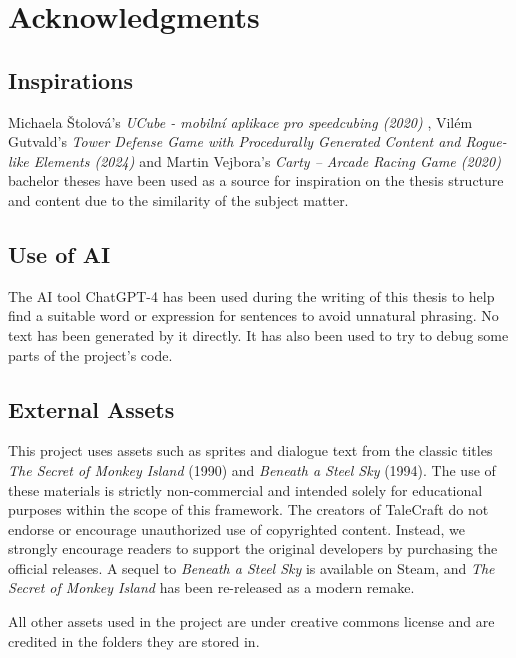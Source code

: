\chapter{Acknowledgments}

\section{Inspirations}
Michaela Štolová's \textit{UCube - mobilní aplikace pro speedcubing (2020)} \cite{Stolova2020}, Vilém Gutvald's \textit{Tower Defense Game with Procedurally Generated Content and Rogue-like Elements (2024)} \cite{Gutvald2024} and Martin Vejbora's \textit{Carty – Arcade Racing Game (2020)} \cite{Vejbora2020} bachelor theses have been used as a source for inspiration on the thesis structure and content due to the similarity of the subject matter.

\section{Use of AI}
The AI tool ChatGPT-4 has been used during the writing of this thesis to help find a suitable word or expression for sentences to avoid unnatural phrasing. No text has been generated by it directly. It has also been used to try to debug some parts of the project's code.

\section{External Assets}
This project uses assets such as sprites and dialogue text from the classic titles \textit{The Secret of Monkey Island} (1990) and \textit{Beneath a Steel Sky} (1994). The use of these materials is strictly non-commercial and intended solely for educational purposes within the scope of this framework. The creators of TaleCraft do not endorse or encourage unauthorized use of copyrighted content. Instead, we strongly encourage readers to support the original developers by purchasing the official releases. A sequel to \textit{Beneath a Steel Sky} is available on Steam, and \textit{The Secret of Monkey Island} has been re-released as a modern remake. 

All other assets used in the project are under creative commons license and are credited in the folders they are stored in.  